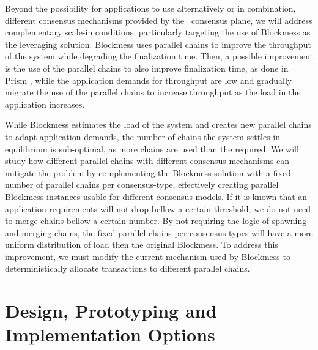 
Beyond the possibility for applications to use alternatively or in combination, different consensus mechanisms provided by the \mysystem~consensus plane, we will address complementary scale-in conditions, particularly targeting the use of Blockmess \cite{blockmess} as the leveraging solution. Blockmess uses parallel chains to improve the throughput of the system while degrading the finalization time. Then, a possible improvement is the use of the parallel chains to also improve finalization time, as done in Prism \cite{prism}, while the application demands for throughput are low and gradually migrate the use of the parallel chains to increase throughput as the load in the application increases.


While Blockmess estimates the load of the system and creates new parallel chains to adapt application demands, the number of chains the system settles in equilibrium is sub-optimal, as more chains are used than the required. We will study how different parallel chains with different consensus mechanisms can mitigate the problem by complementing the Blockmess solution with a fixed number of parallel chains per consensus-type, effectively creating parallel Blockmess instances usable for different consensus models. If it is known that an application requirements will not drop bellow a certain threshold, we do not need to merge chains bellow a certain number. By not requiring the logic of spawning and merging chains, the fixed parallel chains per consensus types will have a more uniform distribution of load then the original Blockmess. To address this improvement, we must modify the current mechanism used by Blockmess to deterministically allocate transactions to different parallel chains.



\section{Design, Prototyping and Implementation Options}
\label{sec:impl_options}

